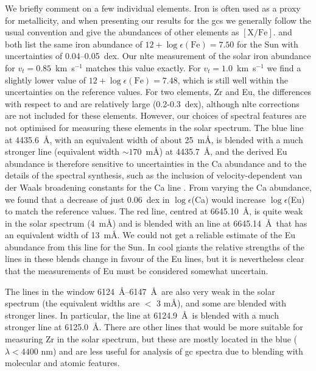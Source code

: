 \documentclass{aa}
\begin{document}
We briefly comment on a few individual elements. Iron is often used as a proxy for metallicity, and when presenting our results for the \acp{gc} we generally follow the usual convention and give the abundances of other elements as $\mathrm{[X/Fe]}$.  and  both list the same iron abundance of $12+\log \epsilon(\mathrm{Fe}) = 7.50$ for the Sun with uncertainties of 0.04--0.05~dex. Our \ac{nlte} measurement of the solar iron abundance for $v_t=0.85$~km~s$^{-1}$ matches this value exactly. For $v_t=1.0$~km~s$^{-1}$ we find a slightly lower value of $12+\log \epsilon(\mathrm{Fe}) = 7.48$, which is still well within the uncertainties on the reference values. 
For two elements, Zr and Eu, the differences with respect to  and  are relatively large (0.2-0.3~dex), although \ac{nlte} corrections are not included for these elements. However, our choices of spectral features are not optimised for measuring these elements in the solar spectrum. The blue  line at 4435.6~\AA, with an equivalent width of about 25~m\AA, is blended with a much stronger  line (equivalent width $\sim170$~m\AA) at 4435.7~\AA, and the derived Eu abundance is therefore sensitive to uncertainties in the Ca abundance and to the details of the spectral synthesis, such as the inclusion of velocity-dependent van der Waals broadening constants for the Ca line \citep{Anstee1995}. 
From varying the Ca abundance, we found that a decrease of just 0.06~dex in $\log\epsilon$(Ca) would increase $\log \epsilon$(Eu) to match the reference values. 
The red  line, centred at 6645.10~\AA, is quite weak in the solar spectrum (4~m\AA) and is
blended with an  line at 6645.14~\AA\ that has an equivalent width of 13~m\AA . We could not get a reliable estimate of the Eu abundance from this line for the Sun. 
In cool giants the relative strengths of the lines in these blends change in favour of the Eu lines, but it is nevertheless clear that the measurements of Eu must be considered somewhat uncertain. 

The  lines in the window 6124~\AA --6147~\AA\ are also very weak in the solar spectrum (the equivalent widths are $<$  3 m\AA), and some are blended with stronger lines. In particular, the  line at 6124.9~\AA\ is blended with a much stronger  line at 6125.0~\AA . There are other lines that would be more suitable for measuring Zr in the solar spectrum, but these are mostly located in the blue ($\lambda<4400$ nm) and are less useful for analysis of \ac{gc} spectra due to blending with molecular and atomic features. 
\end{document}
